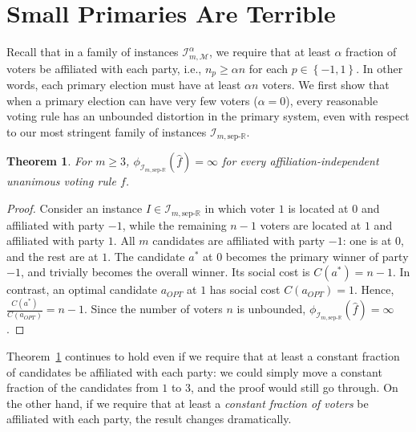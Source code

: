 \documentclass[letterpaper]{article} %
\newtheorem{theorem}{Theorem}
\theoremstyle{definition}
\newcommand{\set}[1]{\left\{#1\right\}}
\renewcommand{\hat}{\widehat}
\newcommand{\bbR}{\mathbb{R}}
\newcommand{\calI}{\mathcal{I}}
\newcommand{\calM}{\mathcal{M}}
\newcommand{\pleft}{-1}
\newcommand{\pright}{1}
\newcommand{\sep}{\textrm{sep-}}
\newcommand{\eucline}{\bbR}
\newcommand{\euclinesep}{\sep\eucline}
\newcommand{\I}{\calI}
\begin{document}
\section{Small Primaries Are Terrible}
\label{sec:small-primaries}
Recall that in a family of instances $\I_{m,\calM}^{\alpha}$, we require that at least $\alpha$ fraction of voters be affiliated with each party, i.e., $n_p \ge \alpha n$ for each $p \in \set{\pleft,\pright}$. In other words, each primary election must have at least $\alpha n$ voters.
We first show that when a primary election can have very few voters ($\alpha = 0$), every reasonable voting rule has an unbounded distortion in the primary system, even with respect to our most stringent family of instances $\I_{m,\euclinesep}$.
\begin{theorem}
	For $m \ge 3$, $\phi_{\I_{m,\euclinesep}}(\hat{f}) = \infty$ for every affiliation-independent unanimous voting rule $f$.
\label{thm:small-primaries-bad}
\end{theorem}
\begin{proof}
	Consider an instance $I \in \I_{m,\euclinesep}$ in which voter $1$ is located at $0$ and affiliated with party $\pleft$, while the remaining $n-1$ voters are located at $1$ and affiliated with party $\pright$. All $m$ candidates are affiliated with party $\pleft$: one is at $0$, and the rest are at $1$.
	The candidate $a^*$ at $0$ becomes the primary winner of party $\pleft$, and trivially becomes the overall winner. Its social cost is $C(a^*) = n-1$. In contrast, an optimal candidate $a_{OPT}$ at $1$ has social cost $C(a_{OPT}) = 1$. Hence, $\frac{C(a^*)}{C(a_{OPT})} = n-1$. Since the number of voters $n$ is unbounded, $\phi_{\I_{m,\euclinesep}}(\hat{f}) = \infty$.
\end{proof}
Theorem~\ref{thm:small-primaries-bad} continues to hold even if we require that at least a constant fraction of candidates be affiliated with each party: we could simply move a constant fraction of the candidates from $1$ to $3$, and the proof would still go through.
On the other hand, if we require that at least a \emph{constant fraction of voters} be affiliated with each party, the result changes dramatically.
\end{document}
